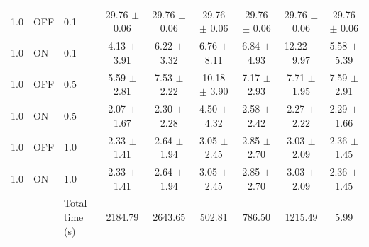 \begin{table}[ht]
{\begin{tabular}{lllcccccc}
1.0 & OFF & 0.1 & 29.76 $\pm$ 0.06 & 29.76 $\pm$ 0.06 & 29.76 $\pm$ 0.06 & 29.76 $\pm$ 0.06 & 29.76 $\pm$ 0.06 & 29.76 $\pm$ 0.06 \\
1.0 & ON & 0.1 & 4.13 $\pm$ 3.91 & 6.22 $\pm$ 3.32 & 6.76 $\pm$ 8.11 & 6.84 $\pm$ 4.93 & 12.22 $\pm$ 9.97 & 5.58 $\pm$ 5.39 \\
1.0 & OFF & 0.5 & 5.59 $\pm$ 2.81 & 7.53 $\pm$ 2.22 & 10.18 $\pm$ 3.90 & 7.17 $\pm$ 2.93 & 7.71 $\pm$ 1.95 & 7.59 $\pm$ 2.91 \\
1.0 & ON & 0.5 & 2.07 $\pm$ 1.67 & 2.30 $\pm$ 2.28 & 4.50 $\pm$ 4.32 & 2.58 $\pm$ 2.42 & 2.27 $\pm$ 2.22 & 2.29 $\pm$ 1.66 \\
1.0 & OFF & 1.0 & 2.33 $\pm$ 1.41 & 2.64 $\pm$ 1.94 & 3.05 $\pm$ 2.45 & 2.85 $\pm$ 2.70 & 3.03 $\pm$ 2.09 & 2.36 $\pm$ 1.45 \\
1.0 & ON & 1.0 & 2.33 $\pm$ 1.41 & 2.64 $\pm$ 1.94 & 3.05 $\pm$ 2.45 & 2.85 $\pm$ 2.70 & 3.03 $\pm$ 2.09 & 2.36 $\pm$ 1.45 \\
\midrule
 &  & Total time (s) & 2184.79 & 2643.65 & 502.81 & 786.50 & 1215.49 & 5.99 \\
\bottomrule
\end{tabular}
}
\end{table}